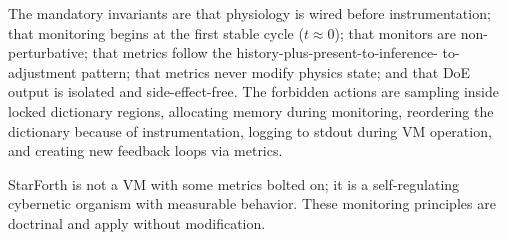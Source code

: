 The mandatory invariants are that physiology is wired before instrumentation;
that monitoring begins at the first stable cycle ($t \approx 0$); that monitors
are non-perturbative; that metrics follow the history-plus-present-to-inference-
to-adjustment pattern; that metrics never modify physics state; and that DoE
output is isolated and side-effect-free. The forbidden actions are sampling
inside locked dictionary regions, allocating memory during monitoring,
reordering the dictionary because of instrumentation, logging to stdout during
VM operation, and creating new feedback loops via metrics.

StarForth is not a VM with some metrics bolted on; it is a self-regulating
cybernetic organism with measurable behavior. These monitoring principles are
doctrinal and apply without modification.
